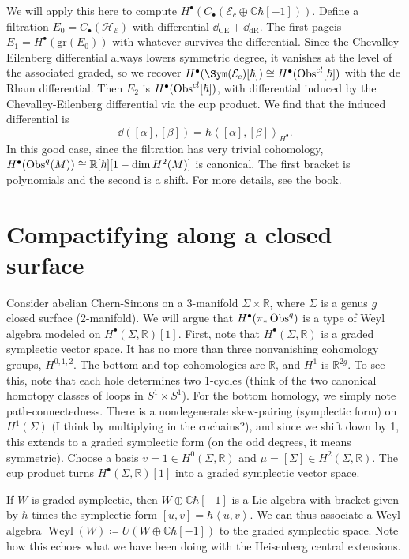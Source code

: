 We will apply this here to compute $H^{\bullet} (C_{\bullet} (\mathcal{E} _c\oplus \mathbb{C} \hbar [-1]))$. Define a filtration $E_0=C_{\bullet} (\mathcal{H} _\mathcal{E} )$ with differential $\dd _{\mathrm{CE} } +\dd _{\mathrm{dR} } $. The first pageis $E_1=H^{\bullet} (\mathrm{gr} (E_0))$ with whatever survives the differential. Since the Chevalley-Eilenberg differential always lowers symmetric degree, it vanishes at the level of the associated graded, so we recover $H^{\bullet} (\Sym (\mathcal{E} _c)[\hbar ])\cong H^{\bullet} (\Obs^{cl} [\hbar ])$ with the de Rham differential. Then $E_2$ is $H^{\bullet} (\operatorname{Obs}^{cl} [\hbar ])$, with differential induced by the Chevalley-Eilenberg differential via the cup product. We find that the induced differential is
\[
	\dd ([\alpha ],[\beta ])=\hbar \left\langle [\alpha ],[\beta ] \right\rangle_{H^{\bullet} } 
.\]
In this good case, since the filtration has very trivial cohomology, $H^{\bullet} (\operatorname{Obs}^q(M)) \cong \mathbb{R} [\hbar ][1-\dim H^2(M)]$ is canonical. The first bracket is polynomials and the second is a shift. For more details, see the book.


\section{Compactifying along a closed surface}

Consider abelian Chern-Simons on a 3-manifold $\Sigma \times \mathbb{R} $, where $\Sigma $ is a genus $g$ closed surface (2-manifold). We will argue that $H^{\bullet} (\pi _*\operatorname{Obs}^q)$ is a type of Weyl algebra modeled on $H^{\bullet} (\Sigma ,\mathbb{R} )[1]$. First, note that $H^{\bullet} (\Sigma ,\mathbb{R} )$ is a graded symplectic vector space. It has no more than three nonvanishing cohomology groups, $H^{0,1,2} $. The bottom and top cohomologies are $\mathbb{R} $, and $H^1$ is $\mathbb{R} ^{2g} $. To see this, note that each hole determines two 1-cycles (think of the two canonical homotopy classes of loops in $S^1\times S^1$). For the bottom homology, we simply note path-connectedness. There is a nondegenerate skew-pairing (symplectic form) on $H^1(\Sigma )$ (I think by multiplying in the cochains?), and since we shift down by 1, this extends to a graded symplectic form (on the odd degrees, it means symmetric). Choose a basis $v=1\in H^0(\Sigma ,\mathbb{R} )$ and $\mu =[\Sigma ]\in H^2(\Sigma ,\mathbb{R} )$. The cup product turns $H^{\bullet} (\Sigma ,\mathbb{R} )[1]$ into a graded symplectic vector space.

If $W$ is graded symplectic, then $W\oplus \mathbb{C} \hbar [-1]$ is a Lie algebra with bracket given by $\hbar $ times the symplectic form $[u,v]=\hbar \left\langle u,v \right\rangle $. We can thus associate a Weyl algebra $\operatorname{Weyl} (W) \coloneqq U(W\oplus \mathbb{C} \hbar [-1])$ to the graded symplectic space. Note how this echoes what we have been doing with the Heisenberg central extensions.

